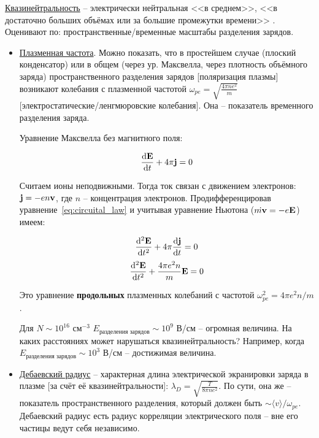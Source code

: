 \documentclass[10pt, a4paper]{article}
\numberwithin{equation}{section}
\begin{document}
\uline{Квазинейтральность} -- электрически нейтральная <<в среднем>>, <<в достаточно больших объёмах или за большие промежутки времени>> \cite{frank}. Оценивают по: пространственные/временные масштабы разделения зарядов.

\begin{itemize}
	\item \uline{Плазменная частота}. Можно показать, что в простейшем случае (плоский конденсатор) или в общем (через ур. Максвелла, через плотность объёмного заряда) пространственного разделения зарядов [поляризация плазмы] возникают колебания с плазменной частотой $\omega_{pe} = \sqrt{\frac{4\pi n e^2}{m}}$ [электростатические/ленгмюровские колебания]. Она -- показатель временного разделения заряда.
	
	Уравнение Максвелла без магнитного поля:
	
	\begin{equation}
		\label{eq:circuital_law}
		\dv{\vb{E}}{t} + 4\pi \vb{j} = 0
	\end{equation}

	Считаем ионы неподвижными. Тогда ток связан с движением электронов: $\vb{j}=-en\vb{v}$, где $n$ -- концентрация электронов. Продифференцировав уравнение~\eqref{eq:circuital_law} и учитывая уравнение Ньютона ($\dot{m\vb{v}}=-e\vb{E}$) имеем:
	
	\begin{equation*}
		\dv[2]{\vb{E}}{t}+4\pi\dv{\vb{j}}{t} = 0
	\end{equation*}
	\begin{equation}
		\dv[2]{\vb{E}}{t}+\frac{4\pi e^2 n}{m}\vb{E} = 0 
	\end{equation}

	Это уравнение \textbf{продольных} плазменных колебаний с частотой $\omega_{pe}^2=4\pi e^2 n/m$.
	
	Для $N\sim 10^{16}$ см$^{-3}$ $E_\text{разделения зарядов} \sim 10^9$ В/см -- огромная величина. На каких расстояниях может нарушаться квазинейтральность? Например, когда $E_\text{разделения зарядов} \sim 10^3$ В/см -- достижимая величина.
	
	\item \uline{Дебаевский радиус} -- характерная длина электрической экранировки заряда в плазме [за счёт её квазинейтральности]: $\lambda_D = \sqrt{\frac{T}{8\pi ne^2}}$. По сути, она же -- показатель пространственного разделения, который должен быть $\sim \langle v \rangle/\omega_{pe}$. Дебаевский радиус есть радиус корреляции электрического поля -- вне его частицы ведут себя независимо.
	

\end{itemize}
\end{document}
